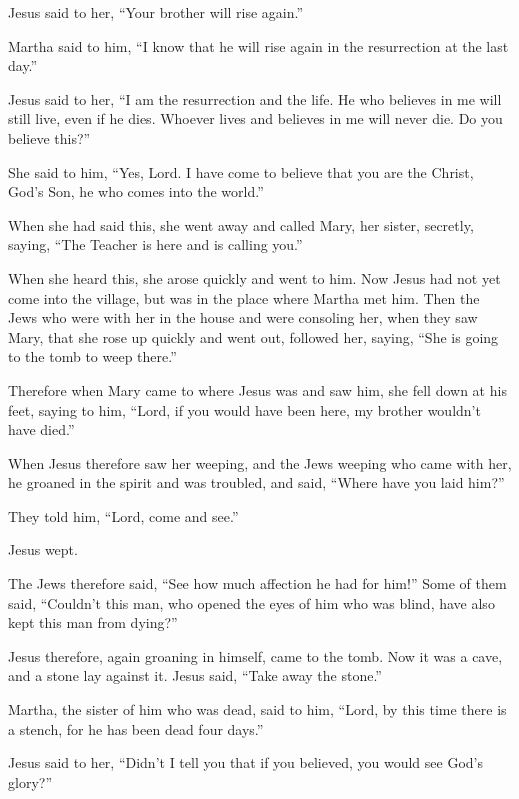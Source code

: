  Jesus said to her, ``Your brother will rise again.''

 Martha said to him, ``I know that he will rise again in
the resurrection at the last day.''

 Jesus said to her, ``I am the resurrection and the life.
He who believes in me will still live, even if he dies. 
Whoever lives and believes in me will never die. Do you believe this?''

 She said to him, ``Yes, Lord. I have come to believe that
you are the Christ, God's Son, he who comes into the world.''

 When she had said this, she went away and called Mary, her
sister, secretly, saying, ``The Teacher is here and is calling you.''

 When she heard this, she arose quickly and went to him.
 Now Jesus had not yet come into the village, but was in
the place where Martha met him.  Then the Jews who were
with her in the house and were consoling her, when they saw Mary, that
she rose up quickly and went out, followed her, saying, ``She is going
to the tomb to weep there.''

 Therefore when Mary came to where Jesus was and saw him,
she fell down at his feet, saying to him, ``Lord, if you would have been
here, my brother wouldn't have died.''

 When Jesus therefore saw her weeping, and the Jews weeping
who came with her, he groaned in the spirit and was troubled,
 and said, ``Where have you laid him?''

They told him, ``Lord, come and see.''

 Jesus wept.

 The Jews therefore said, ``See how much affection he had
for him!''  Some of them said, ``Couldn't this man, who
opened the eyes of him who was blind, have also kept this man from
dying?''

 Jesus therefore, again groaning in himself, came to the
tomb. Now it was a cave, and a stone lay against it.  Jesus
said, ``Take away the stone.''

Martha, the sister of him who was dead, said to him, ``Lord, by this
time there is a stench, for he has been dead four days.''

 Jesus said to her, ``Didn't I tell you that if you
believed, you would see God's glory?''


